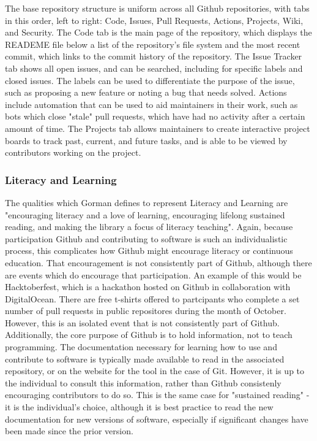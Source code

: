 The base repository structure is uniform across all Github repositories, with tabs in this order, left to right: Code, Issues, Pull Requests, Actions, Projects, Wiki, and Security. The Code tab is the main page of the repository, which displays the READEME file below a list of the repository's file system and the most recent commit, which links to the commit history of the repository. The Issue Tracker tab shows all open issues, and can be searched, including for specific labels and closed issues. The labels can be used to differentiate the purpose of the issue, such as proposing a new feature or noting a bug that needs solved. Actions include automation that can be used to aid maintainers in their work, such as bots which close "stale" pull requests, which have had no activity after a certain amount of time. The Projects tab allows maintainers to create interactive project boards to track past, current, and future tasks, and is able to be viewed by contributors working on the project. 

\subsubsection{Literacy and Learning}

The qualities which Gorman defines to represent Literacy and Learning are "encouraging literacy and a love of learning, encouraging lifelong sustained reading, and making the library a focus of literacy teaching"\cite{gorman2000values}. Again, because participation Github and contributing to software is such an individualistic process, this complicates how Github might encourage literacy or continuous education. That encouragement is not consistently part of Github, although there are events which do encourage that participation. An example of this would be Hacktoberfest, which is a hackathon hosted on Github in collaboration with DigitalOcean. There are free t-shirts offered to partcipants who complete a set number of pull requests in public repositores during the month of October. However, this is an isolated event that is not consistently part of Github. Additionally, the core purpose of Github is to hold information, not to teach programming. The documentation necessary for learning how to use and contribute to software is typically made available to read in the associated repository, or on the website for the tool in the case of Git. However, it is up to the individual to consult this information, rather than Github consistenly encouraging contributors to do so. This is the same case for "sustained reading" - it is the individual's choice, although it is best practice to read the new documentation for new versions of software, especially if significant changes have been made since the prior version. 

